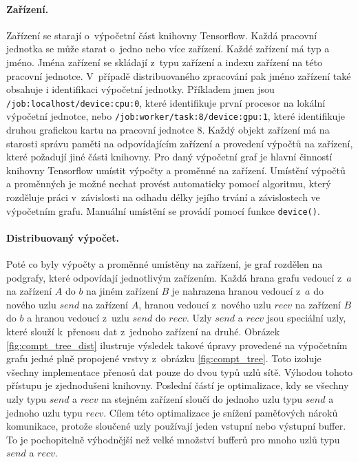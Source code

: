 \paragraph{Zařízení.}
Zařízení se starají o~výpočetní část knihovny Tensorflow.
Každá pracovní jednotka se může starat o~jedno nebo více zařízení.
Každé zařízení má typ a jméno.
Jména zařízení se skládají z~typu zařízení a indexu zařízení na této pracovní jednotce.
V~případě distribuovaného zpracování pak jméno zařízení také obsahuje i identifikaci výpočetní jednotky.
Příkladem jmen jsou {\tt /job:localhost/device:cpu:0}, které identifikuje první procesor na lokální výpočetní jednotce, nebo {\tt /job:worker/task:8/device:gpu:1}, které identifikuje druhou grafickou kartu na pracovní jednotce 8.
Každý objekt zařízení má na starosti správu paměti na odpovídajícím zařízení a provedení výpočtů na zařízení, které požadují jiné části knihovny.
Pro daný výpočetní graf je hlavní činností knihovny Tensorflow umístit výpočty a proměnné na zařízení.
Umístění výpočtů a proměnných je možné nechat provést automaticky pomocí algoritmu, který rozděluje práci v~závislosti na odhadu délky jejího trvání a závislostech ve výpočetním grafu.
Manuální umístění se provádí pomocí funkce {\tt device()}.

\paragraph{Distribuovaný výpočet.}
Poté co byly výpočty a proměnné umístěny na zařízení, je graf rozdělen na podgrafy, které odpovídají jednotlivým zařízením.
Každá hrana grafu vedoucí z~$a$ na zařízení $A$ do $b$ na jiném zařízení $B$ je nahrazena hranou vedoucí z~$a$ do nového uzlu $send$ na zařízení $A$, hranou vedoucí z~nového uzlu $recv$ na zařízení $B$ do $b$ a hranou vedoucí z~uzlu $send$ do $recv$.
Uzly $send$ a $recv$ jsou speciální uzly, které slouží k~přenosu dat z~jednoho zařízení na druhé.
Obrázek \ref{fig:compt_tree_dist} ilustruje výsledek takové úpravy provedené na výpočetním grafu jedné plně propojené vrstvy z~obrázku \ref{fig:compt_tree}.
Toto izoluje všechny implementace přenosů dat pouze do dvou typů uzlů sítě.
Výhodou tohoto přístupu je zjednodušeni knihovny.
Poslední částí je optimalizace, kdy se všechny uzly typu $send$ a $recv$ na stejném zařízení sloučí do jednoho uzlu typu $send$ a jednoho uzlu typu $recv$.
Cílem této optimalizace je snížení paměťových nároků komunikace, protože sloučené uzly používají jeden vstupní nebo výstupní buffer.
To je pochopitelně výhodnější než velké množství bufferů pro mnoho uzlů typu $send$ a $recv$.

